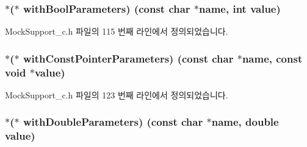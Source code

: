 \subsubsection[{\texorpdfstring{with\+Bool\+Parameters}{withBoolParameters}}]{$\ast$($\ast$ with\+Bool\+Parameters) (const char $\ast$name, int value)}\hypertarget{struct_s_mock_expected_call__c_a881cabeaa3bfe6046bf63daccd180600}{}\label{struct_s_mock_expected_call__c_a881cabeaa3bfe6046bf63daccd180600}


Mock\+Support\+\_\+c.\+h 파일의 115 번째 라인에서 정의되었습니다.

\subsubsection[{\texorpdfstring{with\+Const\+Pointer\+Parameters}{withConstPointerParameters}}]{$\ast$($\ast$ with\+Const\+Pointer\+Parameters) (const char $\ast$name, const void $\ast$value)}\hypertarget{struct_s_mock_expected_call__c_a8c4b2a6c2c7571a54f948de32b863244}{}\label{struct_s_mock_expected_call__c_a8c4b2a6c2c7571a54f948de32b863244}


Mock\+Support\+\_\+c.\+h 파일의 123 번째 라인에서 정의되었습니다.

\subsubsection[{\texorpdfstring{with\+Double\+Parameters}{withDoubleParameters}}]{$\ast$($\ast$ with\+Double\+Parameters) (const char $\ast$name, double value)}\hypertarget{struct_s_mock_expected_call__c_af8a5e60e80a87c9c17e69434183d594c}{}\label{struct_s_mock_expected_call__c_af8a5e60e80a87c9c17e69434183d594c}


